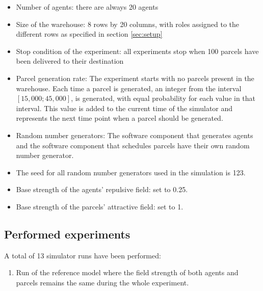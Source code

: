 \begin{itemize}
    \item Number of agents: there are always 20 agents
    \item Size of the warehouse: 8 rows by 20 columns, with roles assigned to the different rows as specified in section \ref{sec:setup}
    \item Stop condition of the experiment: all experiments stop when 100 parcels have been delivered to their destination
    \item Parcel generation rate: The experiment starts with no parcels present in the warehouse. Each time a parcel is generated, an integer from the interval $[15,000 ; 45,000]$, is generated, with equal probability for each value in that interval. This value is added to the current time of the simulator and represents the next time point when a parcel should be generated.
    \item Random number generators: The software component that generates agents and the software component that schedules parcels have their own random number generator.
    \item The seed for all random number generators used in the simulation is 123.
    \item Base strength of the agents' repulsive field: set to 0.25.
    \item Base strength of the parcels' attractive field: set to 1.
\end{itemize}

\subsection{Performed experiments}
A total of 13 simulator runs have been performed:
\begin{enumerate}
    \item Run of the reference model where the field strength of both agents and parcels remains the same during the whole experiment.
\end{enumerate}